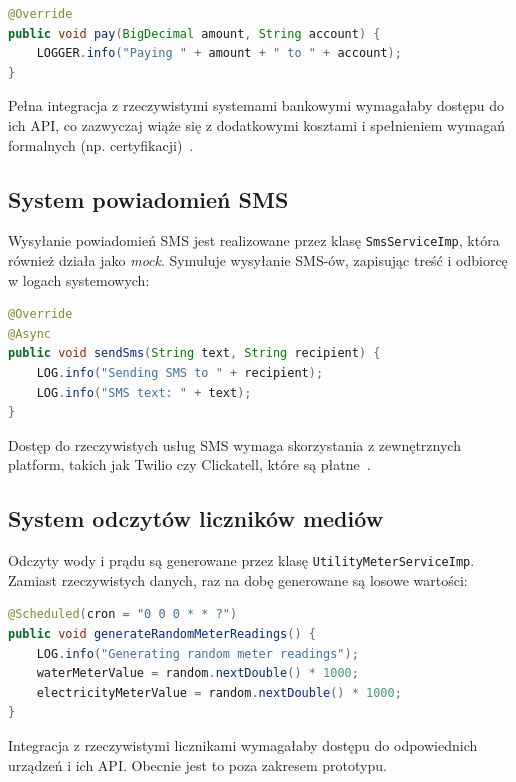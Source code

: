 \begin{lstlisting}[language=Java, style=JavaStyle, caption=Fragment klasy \texttt{BankingServiceImp}]
@Override
public void pay(BigDecimal amount, String account) {
    LOGGER.info("Paying " + amount + " to " + account);
}
\end{lstlisting}

Pełna integracja z rzeczywistymi systemami bankowymi wymagałaby dostępu do ich API, co zazwyczaj wiąże się z dodatkowymi kosztami i spełnieniem wymagań formalnych (np. certyfikacji)~\cite{paypal_api, stripe_api}.

\subsection{System powiadomień SMS}

Wysyłanie powiadomień SMS jest realizowane przez klasę \texttt{SmsServiceImp}, która również działa jako \emph{mock}. Symuluje wysyłanie SMS-ów, zapisując treść i odbiorcę w logach systemowych:

\begin{lstlisting}[language=Java, style=JavaStyle, caption=Fragment klasy \texttt{SmsServiceImp}]
@Override
@Async
public void sendSms(String text, String recipient) {
    LOG.info("Sending SMS to " + recipient);
    LOG.info("SMS text: " + text);
}
\end{lstlisting}

Dostęp do rzeczywistych usług SMS wymaga skorzystania z zewnętrznych platform, takich jak Twilio czy Clickatell, które są płatne~\cite{twilio, clickatell}.

\subsection{System odczytów liczników mediów}

Odczyty wody i prądu są generowane przez klasę \texttt{UtilityMeterServiceImp}. Zamiast rzeczywistych danych, raz na dobę generowane są losowe wartości:

\begin{lstlisting}[language=Java, style=JavaStyle, caption=Fragment klasy \texttt{UtilityMeterServiceImp}]
@Scheduled(cron = "0 0 0 * * ?")
public void generateRandomMeterReadings() {
    LOG.info("Generating random meter readings");
    waterMeterValue = random.nextDouble() * 1000;
    electricityMeterValue = random.nextDouble() * 1000;
}
\end{lstlisting}

Integracja z rzeczywistymi licznikami wymagałaby dostępu do odpowiednich urządzeń i ich API. Obecnie jest to poza zakresem prototypu.

